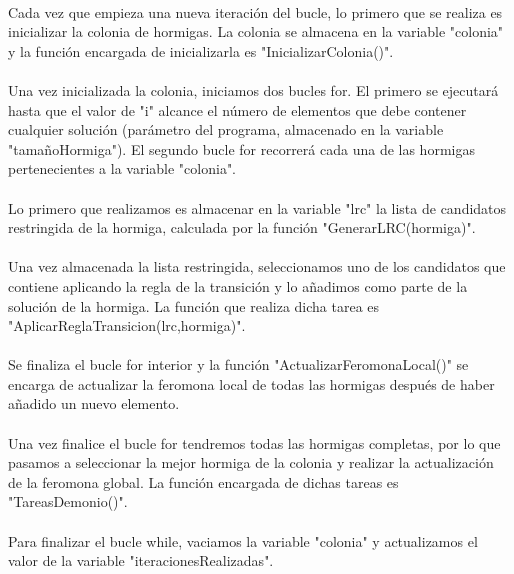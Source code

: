 	\paragraph{}Cada vez que empieza una nueva iteración del bucle, lo primero que se realiza es inicializar la colonia de hormigas. La colonia se almacena en la variable "colonia" y la función encargada de inicializarla es "InicializarColonia()".
	
	\paragraph{}Una vez inicializada la colonia, iniciamos dos bucles for. El primero se ejecutará hasta que el valor de "i" alcance el número de elementos que debe contener cualquier solución (parámetro del programa, almacenado en la variable "tamañoHormiga"). El segundo bucle for recorrerá cada una de las hormigas pertenecientes a la variable "colonia".
	
	\paragraph{}Lo primero que realizamos es almacenar en la variable "lrc" la lista de candidatos restringida de la hormiga, calculada por la función "GenerarLRC(hormiga)".
	
	\paragraph{}Una vez almacenada la lista restringida, seleccionamos uno de los candidatos que contiene aplicando la regla de la transición y lo añadimos como parte de la solución de la hormiga. La función que realiza dicha tarea es "AplicarReglaTransicion(lrc,hormiga)".
	
	\paragraph{}Se finaliza el bucle for interior y la función "ActualizarFeromonaLocal()" se encarga de actualizar la feromona local de todas las hormigas después de haber añadido un nuevo elemento.
	
	\paragraph{}Una vez finalice el bucle for tendremos todas las hormigas completas, por lo que pasamos a seleccionar la mejor hormiga de la colonia y realizar la actualización de la feromona global. La función encargada de dichas tareas es "TareasDemonio()".
	
	\paragraph{}Para finalizar el bucle while, vaciamos la variable "colonia" y actualizamos el valor de la variable "iteracionesRealizadas".